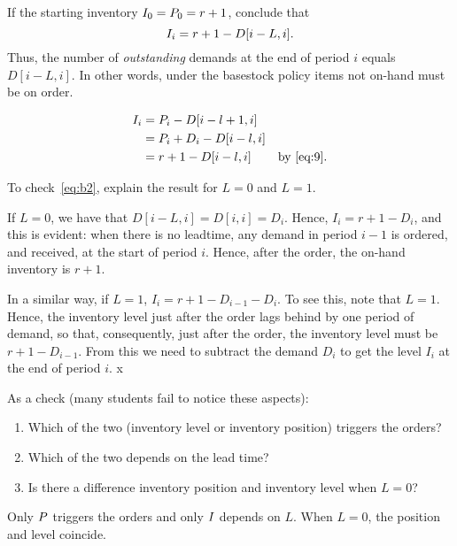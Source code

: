 \begin{exercise}
  If the starting inventory $I_0=P_0 = r+1$, conclude that
  \begin{equation}\label{eq:b2}
    I_i=r+1 - D[i-L, i].
  \end{equation}
Thus, the number of \emph{outstanding} demands at the end of period $i$ equals
$D[i-L, i]$. In other words,  under the basestock policy items not on-hand must be on order. 
  \begin{solution}
\begin{align*}
  I_i 
&= P_i - D[i-l+1, i] \\
&= P_i + D_i - D[i-l, i] \\
&= r+1 - D[i-l, i] &\text{by~\eqref{eq:9}}.
\end{align*}
  \end{solution}
\end{exercise}



\begin{exercise}
To check~\eqref{eq:b2}, explain the result for $L=0$ and $L=1$.
  \begin{solution}
    If $L=0$, we have that $D[i-L,i] = D[i,i] = D_i$. Hence, $I_i = r+1-D_i$, and this is evident: when there is no leadtime, any demand in period $i-1$ is ordered, and received, at the start of period $i$. Hence, after the order, the on-hand inventory is $r+1$. 

In a similar way, if $L=1$, $I_i = r+1 - D_{i-1}- D_i$. To see this, note that $L=1$. Hence, the  inventory level just after the order lags behind by one period of demand, so that, consequently, just after the order, the inventory level must be $r+1-D_{i-1}$. From this we need to subtract the demand $D_i$ to get the level $I_{i}$ at the end of period $i$. x
  \end{solution}
\end{exercise}

\begin{exercise}
  As a check (many students fail to notice these aspects):
  \begin{enumerate}
  \item Which of the two (inventory level or inventory position) triggers the orders?
  \item Which of the two depends on the lead time?
  \item Is there a difference inventory position and inventory level when $L=0$?
  \end{enumerate}
  \begin{solution}
    Only $P$ triggers the orders and only $I$ depends on $L$. When $L=0$, the position and level coincide.
  \end{solution}
\end{exercise}


